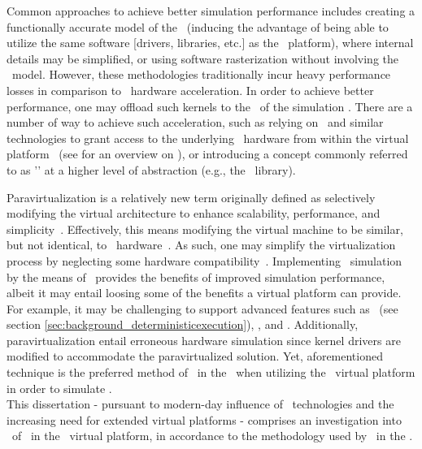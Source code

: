 Common approaches to achieve better simulation performance includes creating a functionally accurate model of the \dvttermgpu\ (inducing the advantage of being able to utilize the same software [drivers, libraries, etc.] as the \dvttermhost\ platform), where internal details may be simplified, or using software rasterization without involving the \dvttermgpu\ model.
However, these methodologies traditionally incur heavy performance losses in comparison to \dvttermgpu\ hardware acceleration.
In order to achieve better performance, one may offload such kernels to the \dvttermgpu\ of the simulation \dvttermhost .
There are a number of way to achieve such acceleration, such as relying on \dvttermpcipassthrough\ and similar technologies to grant access to the underlying \dvttermhost\ hardware from within the virtual platform~ (see  for an overview on \dvttermpcipassthrough ), or introducing a concept commonly referred to as '\dvttermparavirtualization ' at a higher level of abstraction (e.g., the \dvttermopengl\ library).

Paravirtualization is a relatively new term originally defined as selectively modifying the virtual architecture to enhance scalability, performance, and simplicity~.
Effectively, this means modifying the virtual machine to be similar, but not identical, to \dvttermhost\ hardware~.
As such, one may simplify the virtualization process by neglecting some hardware compatibility~.
Implementing \dvttermgpu\ simulation by the means of \dvttermparavirtualization\ provides the benefits of improved simulation performance, albeit it may entail loosing some of the benefits a virtual platform can provide.
For example, it may be challenging to support advanced features such as \dvttermdeterministicexecution\ (see section \ref{sec:background_deterministicexecution}), \dvttermcheckpointing , and \dvttermreverseexecution .
Additionally, paravirtualization entail erroneous hardware simulation since kernel drivers are modified to accommodate the paravirtualized solution.
Yet, aforementioned technique is the preferred method of \dvttermgoogle\ in the \dvttermandroidsdk\ when utilizing the \dvttermqemu\ virtual platform in order to simulate \dvttermopengles .\\

\noindent
This dissertation - pursuant to  modern-day influence of \dvttermgpu\ technologies and the increasing need for extended virtual platforms - comprises an investigation into \dvttermparavirtualization\ of \dvttermopengles\ in the \dvttermsimics\ virtual platform, in accordance to the methodology used by \dvttermgoogle\ in the \dvttermandroidsdk .

